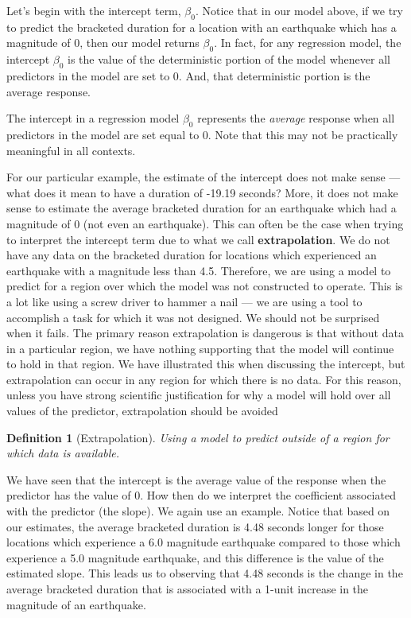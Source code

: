 \documentclass[
]{book}
\theoremstyle{plain}
\theoremstyle{mydefn}
\newtheorem{definition}{Definition}[chapter]
\theoremstyle{myexmpl}
\theoremstyle{remark}
\begin{document}
Let's begin with the intercept term, \(\beta_0\). Notice that in our model above, if we try to predict the bracketed duration for a location with an earthquake which has a magnitude of 0, then our model returns \(\beta_0\). In fact, for any regression model, the intercept \(\beta_0\) is the value of the deterministic portion of the model whenever all predictors in the model are set to 0. And, that deterministic portion is the average response.

\begin{rmdtip}
The intercept in a regression model \(\beta_0\) represents the \emph{average} response when all predictors in the model are set equal to 0. Note that this may not be practically meaningful in all contexts.
\end{rmdtip}

For our particular example, the estimate of the intercept does not make sense --- what does it mean to have a duration of -19.19 seconds? More, it does not make sense to estimate the average bracketed duration for an earthquake which had a magnitude of 0 (not even an earthquake). This can often be the case when trying to interpret the intercept term due to what we call \textbf{extrapolation}. We do not have any data on the bracketed duration for locations which experienced an earthquake with a magnitude less than 4.5. Therefore, we are using a model to predict for a region over which the model was not constructed to operate. This is a lot like using a screw driver to hammer a nail --- we are using a tool to accomplish a task for which it was not designed. We should not be surprised when it fails. The primary reason extrapolation is dangerous is that without data in a particular region, we have nothing supporting that the model will continue to hold in that region. We have illustrated this when discussing the intercept, but extrapolation can occur in any region for which there is no data. For this reason, unless you have strong scientific justification for why a model will hold over all values of the predictor, extrapolation should be avoided

\begin{definition}[Extrapolation]
\protect\hypertarget{def:defn-extrapolation}{}{\label{def:defn-extrapolation} {} }Using a model to predict outside of a region for which data is available.
\end{definition}

We have seen that the intercept is the average value of the response when the predictor has the value of 0. How then do we interpret the coefficient associated with the predictor (the slope). We again use an example. Notice that based on our estimates, the average bracketed duration is 4.48 seconds longer for those locations which experience a 6.0 magnitude earthquake compared to those which experience a 5.0 magnitude earthquake, and this difference is the value of the estimated slope. This leads us to observing that 4.48 seconds is the change in the average bracketed duration that is associated with a 1-unit increase in the magnitude of an earthquake.
\end{document}
